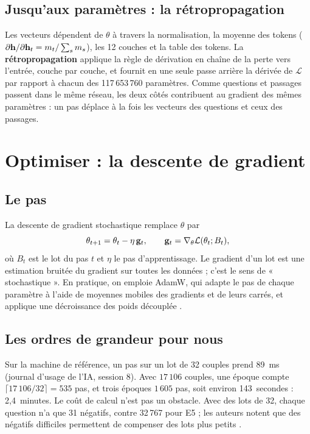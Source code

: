 \subsection{Jusqu'aux paramètres : la rétropropagation}

Les vecteurs dépendent de $\theta$ à travers la normalisation, la moyenne des tokens
($\partial \mathbf{h}/\partial \mathbf{h}_t = m_t / \sum_s m_s$), les 12 couches et la table des tokens. La
\textbf{rétropropagation} applique la règle de dérivation en chaîne de la perte vers l'entrée, couche par couche, et
fournit en une seule passe arrière la dérivée de $\mathcal{L}$ par rapport à chacun des 117\,653\,760 paramètres.
Comme questions et passages passent dans le même réseau, les deux côtés contribuent au gradient des mêmes
paramètres : un pas déplace à la fois les vecteurs des questions et ceux des passages.

\section{Optimiser : la descente de gradient}

\subsection{Le pas}

La descente de gradient stochastique remplace $\theta$ par
\[
  \theta_{t+1} = \theta_t - \eta\, \mathbf{g}_t, \qquad \mathbf{g}_t = \nabla_\theta \mathcal{L}(\theta_t ; B_t),
\]
où $B_t$ est le lot du pas $t$ et $\eta$ le pas d'apprentissage. Le gradient d'un lot est une estimation bruitée du
gradient sur toutes les données ; c'est le sens de « stochastique ». En pratique, on emploie AdamW, qui adapte le
pas de chaque paramètre à l'aide de moyennes mobiles des gradients et de leurs carrés, et applique une décroissance
des poids découplée \source.

\subsection{Les ordres de grandeur pour nous}

\mesure Sur la machine de référence, un pas sur un lot de 32 couples prend 89~ms (journal d'usage de l'IA,
session 8). Avec $17\,106$ couples, une époque compte $\lceil 17\,106 / 32 \rceil = 535$ pas, et trois époques
$1\,605$ pas, soit environ 143~secondes : 2,4~minutes. Le coût de calcul n'est pas un obstacle. Avec des lots de
32, chaque question n'a que 31 négatifs, contre 32\,767 pour E5 ; les auteurs notent que des négatifs difficiles
permettent de compenser des lots plus petits \source.

